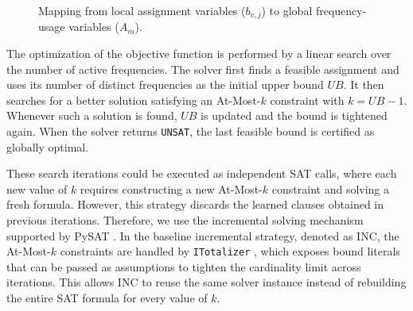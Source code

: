 \begin{figure}[!htbp]
{%
}
\caption{Mapping from local assignment variables ($b_{v,j}$) to global frequency-usage variables ($A_m$).}
\label{fig:b_to_A_implication}
\end{figure}

The optimization of the objective function is performed by a linear search over the number of active frequencies. The solver first finds a feasible assignment and uses its number of distinct frequencies as the initial upper bound $UB$. It then searches for a better solution satisfying an At-Most-$k$ constraint with $k=UB-1$. Whenever such a solution is found, $UB$ is updated and the bound is tightened again. When the solver returns \texttt{UNSAT}, the last feasible bound is certified as globally optimal.

These search iterations could be executed as independent SAT calls, where each new value of $k$ requires constructing a new At-Most-$k$ constraint and solving a fresh formula. However, this strategy discards the learned clauses obtained in previous iterations. Therefore, we use the incremental solving mechanism supported by PySAT \cite{imms-sat18,itk-sat24}. In the baseline incremental strategy, denoted as INC, the At-Most-$k$ constraints are handled by \texttt{ITotalizer} \cite{martins2014incremental,Bailleux2003}, which exposes bound literals that can be passed as assumptions to tighten the cardinality limit across iterations. This allows INC to reuse the same solver instance instead of rebuilding the entire SAT formula for every value of $k$.

